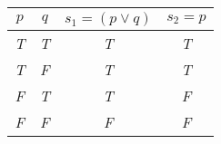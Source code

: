 
\begin{center}
\begin{tabular}{c c||c c}
 $p$  & $q$ & $s_1 = (p \lor q)$ & $s_2 = p$\\
\hline
 \emph{T} & \emph{T} & \emph{T} & \emph{T} \\
 \emph{T} & \emph{F} & \emph{T} & \emph{T} \\
 \emph{F} & \emph{T} & \emph{T} & \emph{F}\\
 \emph{F} & \emph{F} & \emph{F} & \emph{F}\\
\end{tabular}
\end{center}

